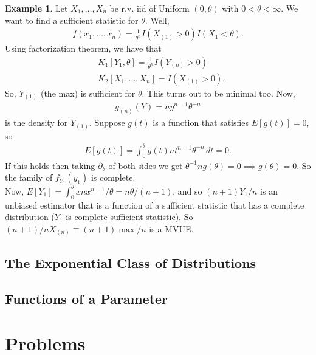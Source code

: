 \documentclass{book}
\theoremstyle{definition}
\newtheorem{exmp}{Example}[section]
\newcommand{\p}{\partial}
\newcommand{\nn}{\nonumber}
\newcommand{\f}[2]{\frac{#1}{#2}}
\begin{document}
\begin{exmp}
	Let $X_1,\dots,X_n$ be r.v. iid of Uniform $(0,\theta)$ with $0 < \theta < \infty$. We want to find a sufficient statistic for $\theta$. Well,
	\begin{align}
	f(x_1,\dots,x_n) = \f{1}{\theta^n}I(X_{(1)} > 0)I(X_{1} < \theta).
	\end{align}
	Using factorization theorem, we have that 
	\begin{align}
	&K_1[Y_1,\theta] = \f{1}{\theta^n}I(Y_{(n)} > 0)\nn\\
	&K_2[X_1,\dots,X_n] = I(X_{(1)} > 0).
	\end{align}
	So, $Y_{(1)}$ (the max) is sufficient for $\theta$. This turns out to be minimal too. Now,
	\begin{align}
	g_{(n)}(Y) = ny^{n-1}\theta^{-n}
	\end{align}
	is the density for $Y_{(1)}$. Suppose $g(t)$ is a function that satisfies $E[g(t)] = 0$, so 
	\begin{align}
	E[g(t)] = \int^\theta_0 g(t)nt^{n-1}\theta^{-n}\,dt = 0.
	\end{align}
	If this holds then taking $\p_\theta$ of both sides we get $\theta^{-1}ng(\theta) = 0 \implies g(\theta)= 0$. So the family of $f_{Y_1}(y_1)$ is complete. \\
	
	Now, $E[Y_1] = \int^\theta_0 x nx^{n-1}/\theta = n\theta/(n+1)$, and so $(n+1)Y_1/n$ is an unbiased estimator that is a function of a sufficient statistic that has a complete distribution ($Y_1$ is complete sufficient statistic). So $(n+1)/n X_{(n)} \equiv (n+1)\max/n$ is a MVUE.  
\end{exmp}






\section{The Exponential Class of Distributions}


\section{Functions of a Parameter}






\newpage


\chapter{Problems}
\end{document}
